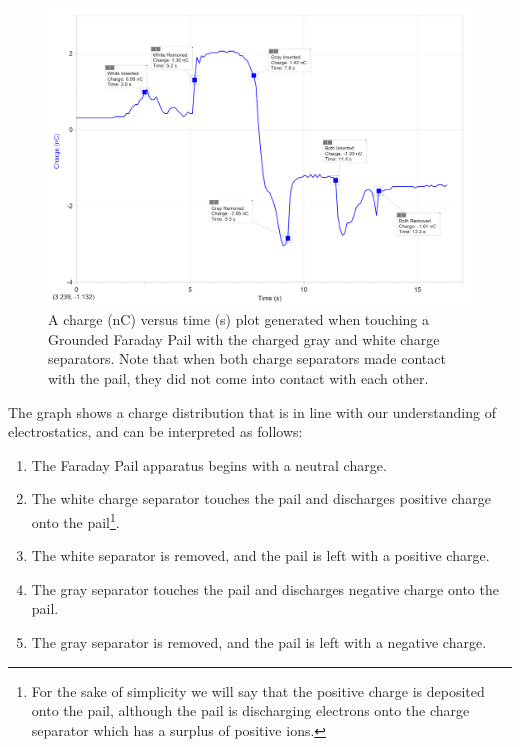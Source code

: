 \documentclass[oneside,12pt]{amsart}
\begin{document}
 
\begin{figure}[h]
	\includegraphics[width=\medgraph,scale=0.01]{SeparatorsContact.png}
	\caption{ A charge (nC) versus time (s) plot generated when touching a Grounded Faraday Pail with the charged gray and white charge separators. Note that when both charge separators made contact with the pail, they did not come into contact with each other.}
	\label{Contact}
\end{figure} 
\newpage
\indent The graph shows a charge distribution that is in line with our understanding of electrostatics, and can be interpreted as follows:
\begin{enumerate}
	\item The Faraday Pail apparatus begins with a neutral charge.
	\item The white charge separator touches the pail and discharges positive charge onto the pail\footnote{For the sake of simplicity we will say that the positive charge is deposited onto the pail, although the pail is discharging electrons onto the charge separator which has a surplus of positive ions.}.
	\item The white separator is removed, and the pail is left with a positive charge.
	\item The gray separator touches the pail and discharges negative charge onto the pail.
	\item The gray separator is removed, and the pail is left with a negative charge.  
\end{enumerate}
\end{document}
